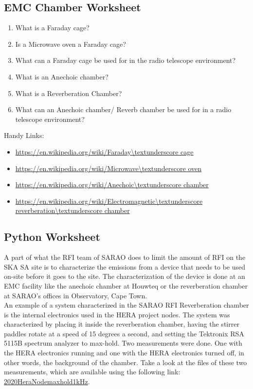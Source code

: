 \documentclass[12pt,a4paper]{report}
\begin{document}
	\subsection*{EMC Chamber Worksheet}
	
	\begin{enumerate}
		\item What is a Faraday cage?
		\item Is a Microwave oven a Faraday cage?
		\item What can a Faraday cage be used for in the radio telescope environment?
		\item What is an Anechoic chamber?
		\item What is a Reverberation Chamber?
		\item What can an Anechoic chamber/ Reverb chamber be used for in a radio telescope environment?
	\end{enumerate}
	
	Handy Links:
	\begin{itemize}
		\item \url{https://en.wikipedia.org/wiki/Faraday\textunderscore cage}
		\item \url{https://en.wikipedia.org/wiki/Microwave\textunderscore oven}
		\item \url{https://en.wikipedia.org/wiki/Anechoic\textunderscore chamber}
		\item \url{https://en.wikipedia.org/wiki/Electromagnetic\textunderscore reverberation\textunderscore chamber}
	\end{itemize}
	
	\subsection*{Python Worksheet}
	
	A part of what the RFI team of SARAO does to limit the amount of RFI on the SKA SA site is to characterize the emissions from a device that needs to be used on-site before it goes to the site. The characterization of the device is done at an EMC facility like the anechoic chamber at Houwteq or the reverberation chamber at SARAO's offices in Observatory, Cape Town.\\
	
	An example of a system characterized in the SARAO RFI Reverberation chamber is the internal electronics used in the HERA project nodes. The system was characterized by placing it inside the reverberation chamber, having the stirrer paddles rotate at a speed of 15 degrees a second, and setting the Tektronix RSA 5115B spectrum analyzer to max-hold. Two measurements were done. One with the HERA electronics running and one with the HERA electronics turned off, in other words, the background of the chamber. Take a look at the files of these two measurements, which are available using the following link: \href{https://github.com/Casablanca25273/Worksheet}{2020\textunderscore Hera\textunderscore Node\textunderscore maxhold\textunderscore 1kHz}.\\
	
\end{document}
